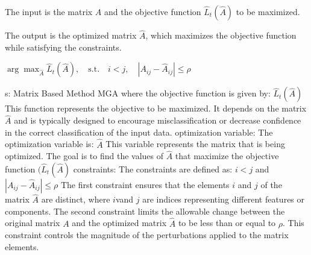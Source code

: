 
The input is the matrix \(A\) and the objective function \(\hat{L}_t(\hat{A})\) to be maximized.

The output is the optimized matrix \(\hat{A}\), which maximizes the objective function while satisfying the constraints.

$\arg \max_{\hat{A}} \hat{L}_t(\hat{A}), \quad \text{s.t.} \quad i < j, \quad |A_{ij} - \hat{A}_{ij}| \leq \rho$

s:
Matrix Based Method MGA where the objective function is given by:
$\hat{L}_t(\hat{A})$
This function represents the objective to be maximized. It depends on the matrix \(\hat{A}\) and is typically designed to encourage misclassification or decrease confidence in the correct classification of the input data.
optimization variable:
The optimization variable is:
$\hat{A}$
This variable represents the matrix that is being optimized. The goal is to find the values of $\hat{A}$ that maximize the objective function $(\hat{L}_t(\hat{A})$
constraints:
The constraints are defined as:
$i < j$
and
$|A_{ij} - \hat{A}_{ij}| \leq \rho$
The first constraint ensures that the elements $i$ and $j$ of the matrix $\hat{A}$ are distinct, where $i$vand $j$ are indices representing different features or components. The second constraint limits the allowable change between the original matrix $A$ and the optimized matrix $\hat{A}$ to be less than or equal to $\rho$. This constraint controls the magnitude of the perturbations applied to the matrix elements.